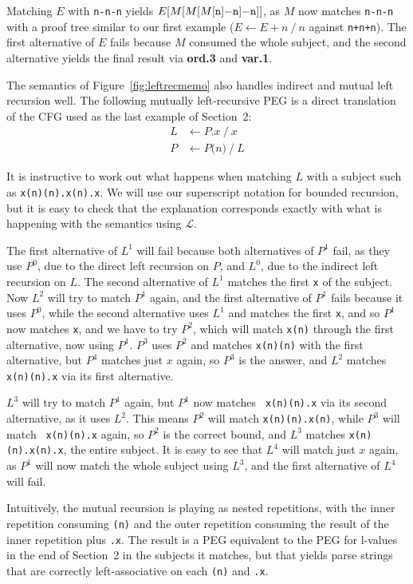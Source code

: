 Matching $E$ with {\tt n-n-n} yields $E[M[M[M[{\tt n}]{\tt -n}]{\tt -n}]]$, as $M$
now matches {\tt n-n-n} with a proof tree similar to our first example ($E
\leftarrow E+n \ / \ n$ against {\tt n+n+n}). The first alternative of $E$
fails because $M$ consumed the whole subject, and the second
alternative yields the final result via {\bf ord.3} and {\bf var.1}.

The semantics of Figure~\ref{fig:leftrecmemo} also handles indirect and
mutual left recursion well. The following mutually left-recursive PEG
is a direct translation of the CFG used as the last example of Section~2:
\begin{align*}
L & \leftarrow P.x \ / \ x \\
P & \leftarrow P\boldsymbol{(}n\boldsymbol{)} \ / \ L 
\end{align*}

It is instructive to work out what happens when matching $L$ with a
subject such as {\tt x(n)(n).x(n).x}. We will use our superscript
notation for bounded recursion, but it is easy to check that the
explanation corresponds exactly with what is happening with the
semantics using $\mathcal{L}$.

The first alternative of $L^1$ will
fail because both alternatives of $P^1$ fail, as they use $P^0$, due
to the direct left recursion on $P$, and $L^0$, due to the indirect
left recursion on $L$. The second alternative of $L^1$ matches the
first {\tt x} of the subject. Now $L^2$ will try to match $P^1$ again,
and the first alternative of $P^1$ fails because it uses $P^0$, while
the second alternative uses $L^1$ and matches the first {\tt x}, and
so $P^1$ now matches {\tt x}, and we have to try $P^2$, which will
match {\tt x(n)} through the first alternative, now using $P^1$. $P^3$
uses $P^2$ and matches {\tt x(n)(n)} with the first alternative, but
$P^4$ matches just $x$ again, so $P^3$ is the answer, and $L^2$
matches {\tt x(n)(n).x} via its first alternative.

$L^3$ will try to match $P^1$ again, but $P^1$ now matches {\tt
  x(n)(n).x} via its second alternative, as it uses $L^2$. This means
$P^2$ will match {\tt x(n)(n).x(n)}, while $P^3$ will match {\tt
  x(n)(n).x} again, so $P^2$ is the correct bound, and $L^3$ matches
{\tt x(n)(n).x(n).x}, the entire subject. It is easy to see that $L^4$
will match just $x$ again, as $P^1$ will now match the whole subject
using $L^3$, and the first alternative of $L^4$ will fail.

Intuitively, the mutual recursion is playing as nested repetitions,
with the inner repetition consuming {\tt (n)} and the outer repetition
consuming the result of the inner repetition plus {\tt .x}. The result
is a PEG equivalent to the PEG for l-values in the end of Section~2 in
the subjects it matches, but that yields parse strings that are
correctly left-associative on each {\tt (n)} and {\tt .x}.


